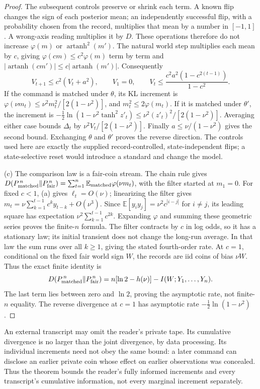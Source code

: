 \documentclass[11pt,a4paper]{article}
\newcommand{\E}{\mathbb E}
\newcommand{\artanh}{\operatorname{artanh}}
\begin{document}
\begin{proof}
The subsequent controls preserve or shrink each term. A known flip changes the sign of each posterior mean; an independently successful flip, with a probability chosen from the record, multiplies that mean by a number in $[-1,1]$. A wrong-axis reading multiplies it by $D$. These operations therefore do not increase $\varphi(m)$ or $\artanh^2(m')$. The natural world step multiplies each mean by $c$, giving $\varphi(cm)\le c^2\varphi(m)$ term by term and $|\artanh(cm')|\le c|\artanh(m')|$. Consequently
\[
 V_{t+1}\le c^2(V_t+a^2),\qquad V_1=0,\qquad
 V_t\le\frac{c^2a^2(1-c^{2(t-1)})}{1-c^2}.
\]
If the command is matched under $\theta$, its KL increment is $\varphi(\nu m_t)\le\nu^2m_t^2/[2(1-\nu^2)]$, and $m_t^2\le2\varphi(m_t)$. If it is matched under $\theta'$, the increment is $-\frac12\ln(1-\nu^2\tanh^2z'_t)\le\nu^2(z'_t)^2/[2(1-\nu^2)]$. Averaging either case bounds $\Delta_t$ by $\nu^2V_t/[2(1-\nu^2)]$. Finally $a\le\nu/(1-\nu^2)$ gives the second bound. Exchanging $\theta$ and $\theta'$ proves the reverse direction. The controls used here are exactly the supplied record-controlled, state-independent flips; a state-selective reset would introduce a standard and change the model.

(c) The comparison law is a fair-coin stream. The chain rule gives
$D(P_{\rm matched}^{\,n}\Vert P_{\rm fair}^{\,n})
=\sum_{t=1}^n\E_{\rm matched}\varphi(\nu m_t)$, with the filter started at
$m_1=0$. For fixed $c<1$, (a) gives $\ell_t=O(\nu)$; linearizing the
filter gives $m_t=\nu\sum_{k=1}^{t-1}c^k y_{t-k}+O(\nu^3)$.
Since $\E[y_iy_j]=\nu^2c^{|i-j|}$ for $i\ne j$, its leading square
has expectation $\nu^2\sum_{k=1}^{t-1}c^{2k}$. Expanding $\varphi$ and
summing these geometric series proves the finite-$n$ formula. The filter
contracts by $c$ in log odds, so it has a stationary law; its initial
transient does not change the long-run average. In that law the sum runs
over all $k\ge1$, giving the stated fourth-order rate. At $c=1$, conditional
on the fixed fair world sign $W$, the records are iid coins of bias $\nu W$.
Thus the exact finite identity is
\[
 D(P_{\rm matched}^{\,n}\Vert P_{\rm fair}^{\,n})
 =n[\ln2-h(\nu)]-I(W;Y_1,\ldots,Y_n).
\]
The last term lies between zero and $\ln2$, proving the asymptotic rate,
not finite-$n$ equality. The reverse divergence at $c=1$ has asymptotic
rate $-\frac12\ln(1-\nu^2)$.
\end{proof}

An external transcript may omit the reader's private tape. Its cumulative divergence is no larger than the joint divergence, by data processing. Its individual increments need not obey the same bound: a later command can disclose an earlier private coin whose effect on earlier observations was concealed. Thus the theorem bounds the reader's fully informed increments and every transcript's cumulative information, not every marginal increment separately.
\end{document}
